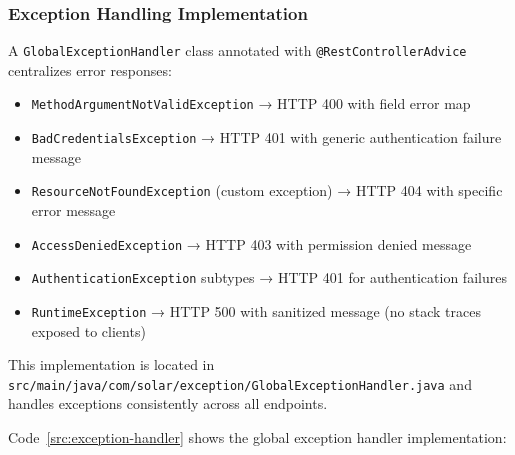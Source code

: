 \subsubsection{Exception Handling Implementation}
\label{subsubsec:exception-handling}

A \texttt{GlobalExceptionHandler} class annotated with \texttt{@RestControllerAdvice} centralizes error responses:
\begin{itemize}
    \item \texttt{MethodArgumentNotValidException} → HTTP 400 with field error map
    \item \texttt{BadCredentialsException} → HTTP 401 with generic authentication failure message
    \item \texttt{ResourceNotFoundException} (custom exception) → HTTP 404 with specific error message
    \item \texttt{AccessDeniedException} → HTTP 403 with permission denied message
    \item \texttt{AuthenticationException} subtypes → HTTP 401 for authentication failures
    \item \texttt{RuntimeException} → HTTP 500 with sanitized message (no stack traces exposed to clients)
\end{itemize}

This implementation is located in \texttt{src/main/java/com/solar/exception/GlobalExceptionHandler.java} and handles exceptions consistently across all endpoints.

Code~\ref{src:exception-handler} shows the global exception handler implementation:

